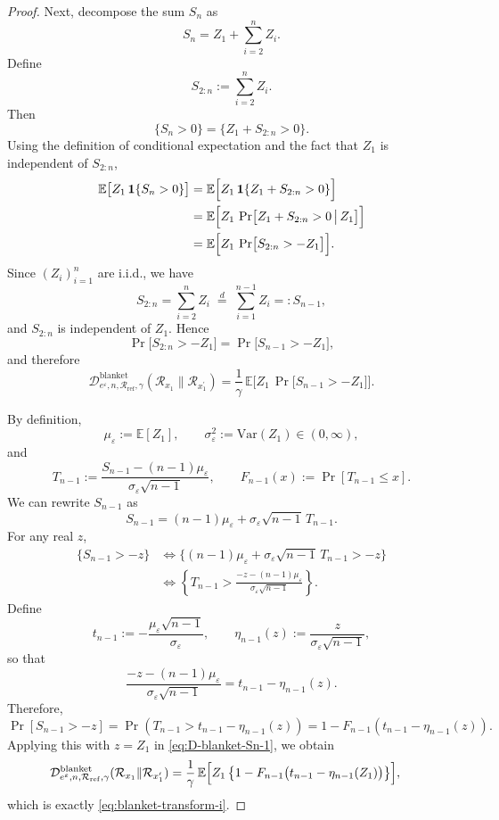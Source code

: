 \documentclass{article}
\theoremstyle{plain}
\theoremstyle{definition}
\begin{document}
\begin{proof}
Next, decompose the sum $S_n$ as
\[
  S_n = Z_1 + \sum_{i=2}^n Z_i.
\]
Define
\[
  S_{2:n} := \sum_{i=2}^n Z_i.
\]
Then
\[
  \{S_n>0\} = \{Z_1 + S_{2:n} > 0\}.
\]
Using the definition of conditional expectation and the fact that
$Z_1$ is independent of $S_{2:n}$,
\[
\begin{aligned}
  \mathbb E\bigl[Z_1\,\mathbf 1\{S_n>0\}\bigr]
  &= \mathbb E\Bigl[
       Z_1\,\mathbf 1\{Z_1 + S_{2:n}>0\}
     \Bigr] \\
  &= \mathbb E\Bigl[
       Z_1\,\Pr \bigl[
         Z_1 + S_{2:n}>0
         \,\big|\,
         Z_1
       \bigr]
     \Bigr] \\
  &= \mathbb E\Bigl[
       Z_1\,\Pr \bigl[
         S_{2:n} > -Z_1
       \bigr]
     \Bigr].
\end{aligned}
\]
Since $(Z_i)_{i=1}^n$ are i.i.d., we have
\[
  S_{2:n} = \sum_{i=2}^n Z_i \;\stackrel{d}{=}\; \sum_{i=1}^{n-1} Z_i =: S_{n-1},
\]
and $S_{2:n}$ is independent of $Z_1$. Hence
\[
  \Pr \bigl[S_{2:n} > -Z_1\bigr]
  = \Pr \bigl[S_{n-1} > -Z_1\bigr],
\]
and therefore
\begin{equation}
  \label{eq:D-blanket-Sn-1}
  \mathcal D^{\mathrm{blanket}}_{e^{\varepsilon},n,\mathcal R_{\mathrm{ref}},\gamma}(
    \mathcal{R}_{x_1} \| \mathcal{R}_{x_1^\prime})
  = \frac{1}{\gamma}\,
    \mathbb E\bigl[
      Z_1\,\Pr \bigl[S_{n-1} > -Z_1\bigr]
    \bigr].
\end{equation}

By definition,
\[
  \mu_\varepsilon := \mathbb E[Z_1],
  \qquad
  \sigma_\varepsilon^2 := \mathrm{Var}(Z_1) \in (0,\infty),
\]
and
\[
  T_{n-1}
  := \frac{S_{n-1} - (n-1)\mu_\varepsilon}{\sigma_\varepsilon\sqrt{n-1}},
  \qquad
  F_{n-1}(x) := \Pr\left[T_{n-1}\le x\right].
\]
We can rewrite $S_{n-1}$ as
\[
  S_{n-1} = (n-1)\mu_\varepsilon + \sigma_\varepsilon\sqrt{n-1}\,T_{n-1}.
\]
For any real $z$,
\[
\begin{aligned}
  \{S_{n-1} > -z\}
  &\iff
  \bigl\{
    (n-1)\mu_\varepsilon + \sigma_\varepsilon\sqrt{n-1}\,T_{n-1}
    > -z
  \bigr\} \\
  &\iff
  \left\{
    T_{n-1}
    >
    \frac{-z - (n-1)\mu_\varepsilon}{\sigma_\varepsilon\sqrt{n-1}}
  \right\}.
\end{aligned}
\]
Define
\[
  t_{n-1}
  := -\frac{\mu_\varepsilon\sqrt{n-1}}{\sigma_\varepsilon},
  \qquad
  \eta_{n-1}(z)
  := \frac{z}{\sigma_\varepsilon\sqrt{n-1}},
\]
so that
\[
  \frac{-z - (n-1)\mu_\varepsilon}{\sigma_\varepsilon\sqrt{n-1}}
  = t_{n-1} - \eta_{n-1}(z).
\]
Therefore,
\[
  \Pr \left[S_{n-1}>-z\right]
  = \Pr \left(
      T_{n-1} > t_{n-1} - \eta_{n-1}(z)
    \right)
  = 1 - F_{n-1}\left(t_{n-1} - \eta_{n-1}(z)\right).
\]
Applying this with $z=Z_1$ in \eqref{eq:D-blanket-Sn-1}, we obtain
\[
\begin{aligned}
  \mathcal D^{\mathrm{blanket}}_{e^{\varepsilon},n,\mathcal R_{\mathrm{ref}},\gamma}(
    \mathcal{R}_{x_1} \| \mathcal{R}_{x_1^\prime})
  &= \frac{1}{\gamma}\,
     \mathbb E\Bigl[
       Z_1\,
       \bigl\{
         1 - F_{n-1}\bigl(t_{n-1} - \eta_{n-1}(Z_1)\bigr)
       \bigr\}
     \Bigr],
\end{aligned}
\]
which is exactly \eqref{eq:blanket-transform-i}.


\end{proof}
\end{document}
